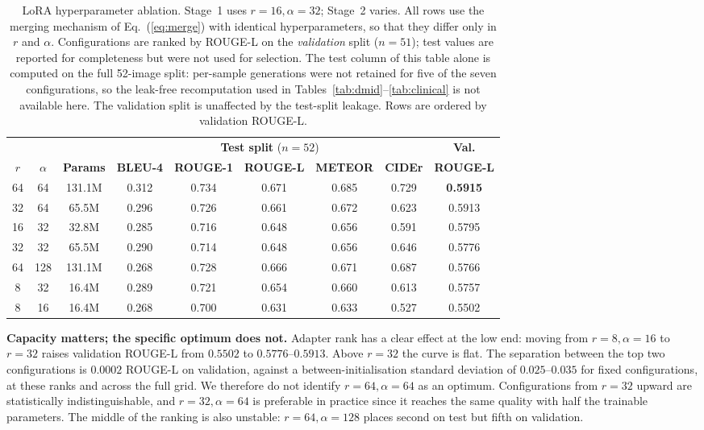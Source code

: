 \documentclass{wlscirep}
\begin{document}
\begin{table}[H]
\centering
\caption{LoRA hyperparameter ablation. Stage~1 uses $r=16, \alpha=32$; Stage~2 varies. All rows use the merging mechanism of Eq.~(\ref{eq:merge}) with identical hyperparameters, so that they differ only in $r$ and $\alpha$. Configurations are ranked by ROUGE-L on the \emph{validation} split ($n=51$); test values are reported for completeness but were not used for selection. The test column of this table alone is computed on the full 52-image split: per-sample generations were not retained for five of the seven configurations, so the leak-free recomputation used in Tables~\ref{tab:dmid}--\ref{tab:clinical} is not available here. The validation split is unaffected by the test-split leakage. Rows are ordered by validation ROUGE-L.}
\label{tab:lora}
\begin{adjustbox}{max width=\textwidth}
\begin{tabular}{ccccccccc}
\toprule
& & & \multicolumn{5}{c}{\textbf{Test split} ($n=52$)} & \textbf{Val.} \\
\cmidrule(lr){4-8} \cmidrule(lr){9-9}
$r$ & $\alpha$ & \textbf{Params} & \textbf{BLEU-4} & \textbf{ROUGE-1} & \textbf{ROUGE-L} & \textbf{METEOR} & \textbf{CIDEr} & \textbf{ROUGE-L} \\
\midrule
64 & 64 & 131.1M & 0.312 & 0.734 & 0.671 & 0.685 & 0.729 & \textbf{0.5915} \\
32 & 64 & 65.5M & 0.296 & 0.726 & 0.661 & 0.672 & 0.623 & 0.5913 \\
16 & 32 & 32.8M & 0.285 & 0.716 & 0.648 & 0.656 & 0.591 & 0.5795 \\
32 & 32 & 65.5M & 0.290 & 0.714 & 0.648 & 0.656 & 0.646 & 0.5776 \\
64 & 128 & 131.1M & 0.268 & 0.728 & 0.666 & 0.671 & 0.687 & 0.5766 \\
8 & 32 & 16.4M & 0.289 & 0.721 & 0.654 & 0.660 & 0.613 & 0.5757 \\
8 & 16 & 16.4M & 0.268 & 0.700 & 0.631 & 0.633 & 0.527 & 0.5502 \\
\bottomrule
\end{tabular}
\end{adjustbox}
\end{table}

\textbf{Capacity matters; the specific optimum does not.} Adapter rank has a clear effect at the low end: moving from $r=8,\alpha=16$ to $r=32$ raises validation ROUGE-L from $0.5502$ to $0.5776$--$0.5913$. Above $r=32$ the curve is flat. The separation between the top two configurations is $0.0002$ ROUGE-L on validation, against a between-initialisation standard deviation of $0.025$--$0.035$ for fixed configurations, at these ranks and across the full grid. We therefore do not identify $r=64,\alpha=64$ as an optimum. Configurations from $r=32$ upward are statistically indistinguishable, and $r=32,\alpha=64$ is preferable in practice since it reaches the same quality with half the trainable parameters. The middle of the ranking is also unstable: $r=64,\alpha=128$ places second on test but fifth on validation.
\end{document}
